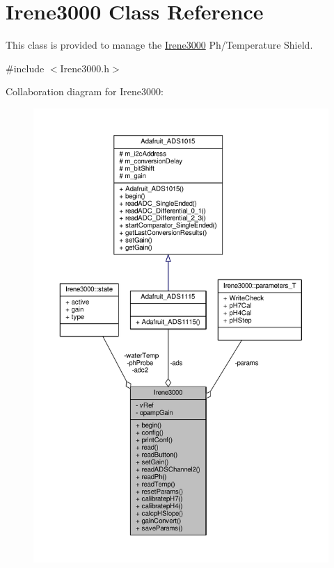\hypertarget{class_irene3000}{}\section{Irene3000 Class Reference}
\label{class_irene3000}


This class is provided to manage the \hyperlink{class_irene3000}{Irene3000} Ph/\+Temperature Shield.  




{\ttfamily \#include $<$Irene3000.\+h$>$}



Collaboration diagram for Irene3000\+:\nopagebreak
\begin{figure}[H]
\begin{center}
\leavevmode
\includegraphics[width=350pt]{class_irene3000__coll__graph}
\end{center}
\end{figure}
